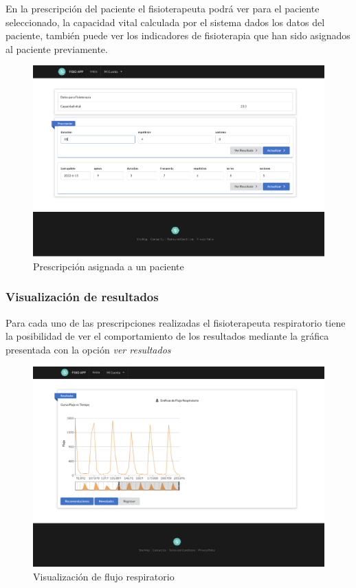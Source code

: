 \documentclass[12pt]{article}
\begin{document}
En la prescripción del paciente el fisioterapeuta podrá ver para el paciente seleccionado, la capacidad vital calculada por el sistema dados los datos del paciente, también puede ver los indicadores de fisioterapia que han sido asignados al paciente previamente.

\begin{figure}[ht]
\centering
\includegraphics[scale=0.3]{imag/appprescripcionuser.png}
\caption{Prescripción asignada a un paciente}
\label{6}
\end{figure}
\FloatBarrier



\subsubsection{Visualización de resultados}

Para cada uno de las prescripciones realizadas el fisioterapeuta respiratorio tiene la posibilidad de ver el comportamiento de los resultados mediante la gráfica presentada con la opción \textit{ver resultados}

\begin{figure}[ht]
\centering
\includegraphics[scale=0.3]{imag/appresultadosflujotiempo.png}
\caption{Visualización de flujo respiratorio}
\label{6}
\end{figure}
\FloatBarrier
\end{document}
